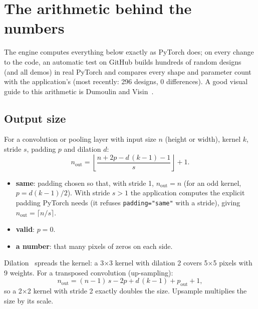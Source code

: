\documentclass[11pt,a4paper]{article}
\begin{document}


\section{The arithmetic behind the numbers}
\label{sec:math}

The engine computes everything below exactly as PyTorch does; on every change to the code, an automatic test on GitHub builds hundreds of
random designs (and all demos) in real PyTorch and compares every shape and parameter count with the application's (most recently:
296 designs, 0 differences). A good visual guide to this arithmetic is Dumoulin and Visin~\cite{dumoulin2016guide}.

\subsection{Output size}
For a convolution or pooling layer with input size $n$ (height or width), kernel $k$, stride $s$, padding $p$ and dilation $d$:
\begin{equation}
  n_{\text{out}} = \left\lfloor \frac{n + 2p - d\,(k-1) - 1}{s} \right\rfloor + 1 .
\end{equation}
\begin{itemize}
  \item \textbf{same}: padding chosen so that, with stride 1, $n_{\text{out}}=n$ (for an odd kernel, $p=d(k-1)/2$). With stride $s>1$
        the application computes the explicit padding PyTorch needs (it refuses \texttt{padding="same"} with a stride), giving
        $n_{\text{out}}=\lceil n/s\rceil$.
  \item \textbf{valid}: $p=0$.
  \item \textbf{a number}: that many pixels of zeros on each side.
\end{itemize}
Dilation~\cite{yu2015dilated} spreads the kernel: a 3$\times$3 kernel with dilation 2 covers 5$\times$5 pixels with 9 weights.
For a transposed convolution (up-sampling):
\begin{equation}
  n_{\text{out}} = (n-1)\,s - 2p + d\,(k-1) + p_{\text{out}} + 1 ,
\end{equation}
so a 2$\times$2 kernel with stride 2 exactly doubles the size. Upsample multiplies the size by its scale.
\end{document}
